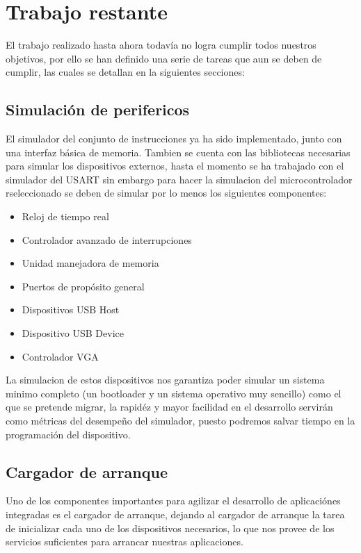 \chapter{Trabajo restante}

El trabajo realizado hasta ahora todav\'ia no logra cumplir todos nuestros objetivos, por ello se han definido una serie de tareas que aun se deben de cumplir, las cuales se detallan en la siguientes secciones:

\section{Simulaci\'on de perifericos}

El simulador del conjunto de instrucciones ya ha sido implementado, junto con una interfaz b\'asica de memoria. Tambien se cuenta con las bibliotecas necesarias para simular los dispositivos externos, hasta el momento se ha trabajado con el simulador del USART sin embargo para hacer la simulacion del microcontrolador rseleccionado se deben de simular por lo menos los siguientes componentes:

\begin{itemize}

\item Reloj de tiempo real
\item Controlador avanzado de interrupciones
\item Unidad manejadora de memoria
\item Puertos de prop\'osito general
\item Dispositivos USB Host
\item Dispositivo USB Device
\item Controlador VGA

\end{itemize}

La simulacion de estos dispositivos nos garantiza poder simular un sistema minimo completo (un bootloader y un sistema operativo muy sencillo) como el que se pretende migrar, la rapid\'ez y mayor facilidad en el desarrollo servir\'an como m\'etricas del desempe\~no del simulador, puesto podremos salvar tiempo en la programaci\'on del dispositivo.

\section{Cargador de arranque}

Uno de los componentes importantes para agilizar el desarrollo de aplicaci\'ones integradas es el cargador de arranque, dejando al cargador de arranque la tarea de inicializar cada uno de los dispositivos necesarios, lo que nos provee de los servicios suficientes para arrancar nuestras aplicaciones.


